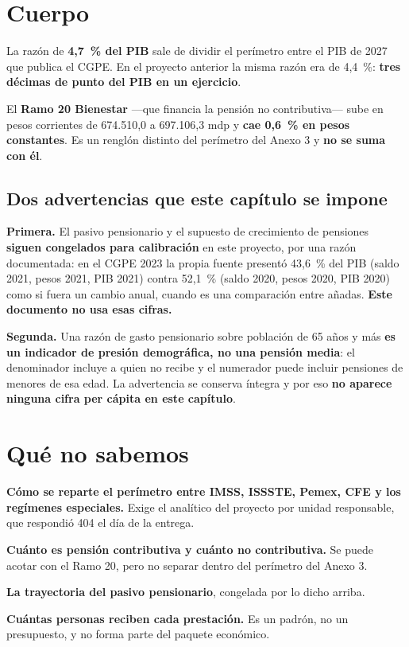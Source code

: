 \section{Cuerpo}

La razón de \textbf{4,7~\% del PIB} sale de dividir el perímetro entre el PIB de 2027 que
publica el CGPE. En el proyecto anterior la misma razón era de 4,4~\%: \textbf{tres décimas
de punto del PIB en un ejercicio}.

El \textbf{Ramo 20 Bienestar} ---que financia la pensión no contributiva--- sube en pesos
corrientes de 674.510,0 a 697.106,3 mdp y \textbf{cae 0,6~\% en pesos constantes}. Es un
renglón distinto del perímetro del Anexo 3 y \textbf{no se suma con él}.

\subsection*{Dos advertencias que este capítulo se impone}

\textbf{Primera.} El pasivo pensionario y el supuesto de crecimiento de pensiones
\textbf{siguen congelados para calibración} en este proyecto, por una razón documentada: en
el CGPE 2023 la propia fuente presentó 43,6~\% del PIB (saldo 2021, pesos 2021, PIB 2021)
contra 52,1~\% (saldo 2020, pesos 2020, PIB 2020) como si fuera un cambio anual, cuando es
una comparación entre añadas. \textbf{Este documento no usa esas cifras.}

\textbf{Segunda.} Una razón de gasto pensionario sobre población de 65 años y más
\textbf{es un indicador de presión demográfica, no una pensión media}: el denominador
incluye a quien no recibe y el numerador puede incluir pensiones de menores de esa edad. La
advertencia se conserva íntegra y por eso \textbf{no aparece ninguna cifra per cápita en
este capítulo}.

\section{Qué no sabemos}

\begin{list}{}{\setlength{\leftmargin}{1.4em}\setlength{\itemsep}{2pt}}
\item[$\bullet$] \textbf{Cómo se reparte el perímetro entre IMSS, ISSSTE, Pemex, CFE y los
regímenes especiales.} Exige el analítico del proyecto por unidad responsable, que respondió
404 el día de la entrega.
\item[$\bullet$] \textbf{Cuánto es pensión contributiva y cuánto no contributiva.} Se
puede acotar con el Ramo 20, pero no separar dentro del perímetro del Anexo 3.
\item[$\bullet$] \textbf{La trayectoria del pasivo pensionario}, congelada por lo dicho
arriba.
\item[$\bullet$] \textbf{Cuántas personas reciben cada prestación.} Es un padrón, no un
presupuesto, y no forma parte del paquete económico.
\end{list}

